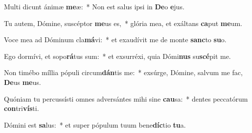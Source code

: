 \item Multi dicunt ánimæ \textbf{me}æ:~* Non est salus ipsi in \textbf{De}o \textbf{e}jus.
\item Tu autem, Dómine, suscéptor \textbf{me}us es,~* glória mea, et exáltans \textbf{ca}put \textbf{me}um.
\item Voce mea ad Dóminum cla\textbf{má}vi:~* et exaudívit me de monte \textbf{sanc}to \textbf{su}o.
\item Ego dormívi, et sopo\textbf{rá}tus sum:~* et exsurréxi, quia Dómi\textbf{nus} su\textbf{scé}pit me.
\item Non timébo míllia pópuli circum\textbf{dán}tis me:~* exsúrge, Dómine, salvum me fac, \textbf{De}us \textbf{me}us.
\item Quóniam tu percussísti omnes adversántes mihi sine \textbf{cau}sa:~* dentes peccatórum \textbf{con}tri\textbf{vís}ti.
\item Dómini est \textbf{sa}lus:~* et super pópulum tuum bene\textbf{díc}tio \textbf{tu}a.
